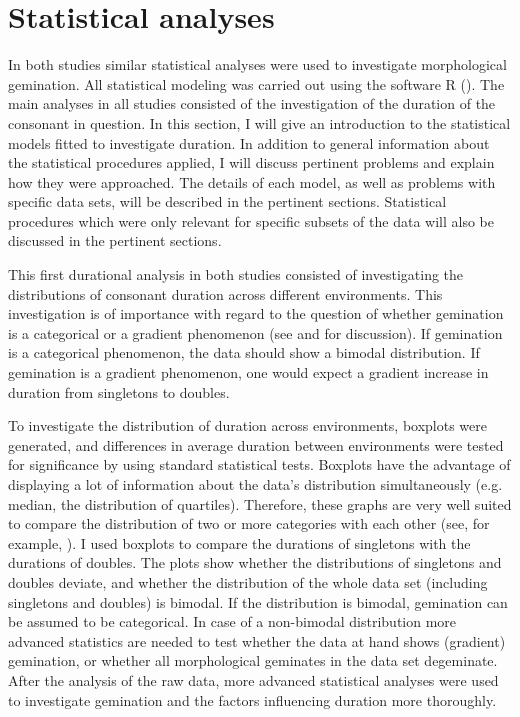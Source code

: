\section{Statistical analyses}\label{stats}

In both studies similar statistical analyses were used to investigate morphological gemination. All statistical modeling was carried out using the software R (\citealt{RDevelopmentCoreTeam.2014}). 
The main analyses in all studies consisted of the investigation of the duration of the consonant in question. 
In this section, I will give an introduction to the statistical models fitted to investigate duration. In addition to general information about the statistical procedures applied, I will discuss pertinent problems and explain how they were approached. The details of each model, as well as problems with specific data sets, will be described in the pertinent sections. Statistical procedures which were only relevant for specific subsets of the data will also be discussed in the pertinent sections. 




This first durational analysis in both studies consisted of investigating the distributions of consonant duration across different environments. This investigation is of importance with regard to the question of whether gemination is a categorical or a gradient phenomenon (see  and  for discussion). If gemination is a categorical phenomenon, the data should show a bimodal distribution. If gemination is a gradient phenomenon, one would expect a gradient increase in duration from singletons to doubles.

 To investigate the distribution of duration across environments, boxplots were generated, and differences in average duration between environments were tested for significance by using standard statistical tests. Boxplots have the advantage of displaying a lot of information about the data's distribution simultaneously (e.g. median, the distribution of quartiles). Therefore, these graphs are very well suited to compare the distribution of two or more categories with each other (see, for example, \citealt{Benjamini.1988}).  
 I used boxplots to compare the durations of singletons with the durations of doubles. The plots show whether the distributions of singletons and doubles deviate, and whether the distribution of the whole data set (including singletons and doubles) is bimodal. If the distribution is bimodal, gemination can be assumed to be categorical.
  In case of a non-bimodal distribution more advanced statistics are needed to test whether the data at hand shows (gradient) gemination, or whether all morphological geminates in the data set degeminate.
 After the analysis of the raw data, more advanced statistical analyses were used to investigate gemination and the factors influencing duration more thoroughly.


